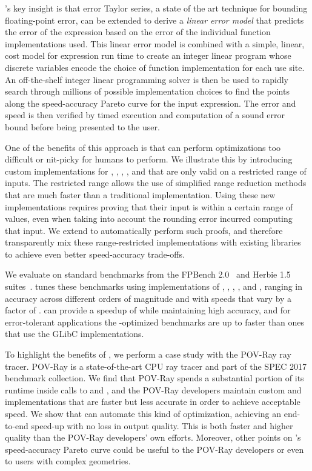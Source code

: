 \documentclass[paper.tex]{subfiles}
\begin{document}
\name's key insight
  is that error Taylor series, a state of the art technique
  for bounding floating-point error,
  can be extended to derive
  a \textit{linear error model}
  that predicts the error of the expression
  based on the error of the individual function implementations used.
This linear error model is combined
  with a simple, linear, cost model for expression run time
  to create an integer linear program
  whose discrete variables encode the choice
  of function implementation for each use site.
An off-the-shelf integer linear programming solver
  is then be used to rapidly search
  through millions of possible implementation choices
  to find the points along the speed-accuracy Pareto curve
  for the input expression.
The error and speed is then verified by timed execution and computation of a
  sound error bound before being
  presented to the user.

One of the benefits of this approach
  is that \name can perform optimizations
  too difficult or nit-picky for humans to perform.
We illustrate this
  by introducing custom implementations
  for , , , , and 
  that are only valid on a restricted range of inputs.
The restricted range allows
  the use of simplified range reduction methods
  that are much faster than a traditional implementation.
Using these new implementations requires proving
  that their input is within a certain range of values,
  even when taking into account
  the rounding error incurred computing that input.
We extend \name to automatically perform such proofs,
  and therefore transparently mix
  these range-restricted implementations with existing libraries
  to achieve even better speed-accuracy trade-offs.

We evaluate \name on \nBenchmarks standard benchmarks
  from the FPBench 2.0~\cite{fpbench} and Herbie 1.5 suites~\cite{herbie}.
\name tunes these benchmarks using
  \nOptunerImpls implementations
  of , , , , and ,
  ranging in accuracy across \nOptunerImplErrorOrders different orders of magnitude
  and with speeds that vary by a factor of \nOptunerImplSpeed.
\name can provide a speedup of \nBenchmarkSafeSpeedup
  while maintaining high accuracy,
  and for error-tolerant applications
  the \name-optimized benchmarks
  are up to \nBenchmarkLargeSpeedup faster
  than ones that use the GLibC implementations.

To highlight the benefits of \name,
  we perform a case study with the POV-Ray ray tracer.
POV-Ray is a state-of-the-art CPU ray tracer
  and part of the SPEC 2017 benchmark collection.
We find that POV-Ray
  spends a substantial portion of its runtime
  inside calls to  and ,
  and the POV-Ray developers
  maintain custom  and  implementations
  that are faster but less accurate
  in order to achieve acceptable speed.
We show that \name can automate this kind of optimization,
  achieving an end-to-end \nPovRayLosslessSpeedup speed-up
  with no loss in output quality.
This is both faster and higher quality
  than the POV-Ray developers' own efforts.
Moreover, other points on \name's speed-accuracy Pareto curve
  could be useful to the POV-Ray developers
  or even to users with complex geometries.
\end{document}
